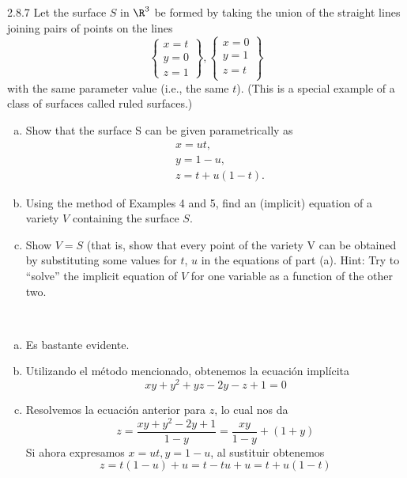 \documentclass[twoside]{article}
\begin{document}
\begin{ejercicio}{2.8.7}
Let the surface $S$ in $\R^3$ be formed by taking the union of the straight lines joining pairs
of points on the lines 
$$\left\lbrace
\begin{array}{c}
x = t\\
y = 0\\
z = 1
\end{array}
\right\rbrace,
\left\lbrace
\begin{array}{c}
x = 0\\
y = 1\\
z = t\\
\end{array}
\right\rbrace$$
with the same parameter value (i.e., the same $t$). (This is a special example of a class of
surfaces called ruled surfaces.)
\begin{enumerate}[a.]
\item Show that the surface S can be given parametrically as
\begin{align*}
&x = ut,\\
&y = 1 − u,\\
&z = t + u(1 − t).
\end{align*}
\item Using the method of Examples 4 and 5, find an (implicit) equation of a variety $V$
containing the surface $S$.
\item Show $V = S$ (that is, show that every point of the variety V can be obtained by
substituting some values for $t$, $u$ in the equations of part (a). Hint: Try to “solve” the
implicit equation of $V$ for one variable as a function of the other two.
\end{enumerate}
\end{ejercicio}
\begin{solucion}\
\begin{enumerate}[a.]
\item Es bastante evidente.
\item Utilizando el método mencionado, obtenemos la ecuación implícita
\[
xy + y^2 + yz - 2y - z + 1=0
\]
\item Resolvemos la ecuación anterior para $z$, lo cual nos da
\[
z=\frac{xy+y^2-2y+1}{1-y}=\frac{xy}{1-y}+(1+y)
\]
Si ahora expresamos $x=ut, y=1-u$, al sustituir obtenemos
\[
z=t(1-u)+u=t-tu+u=t+u(1-t)
\]
\end{enumerate}
\end{solucion}

\newpage
\end{document}
